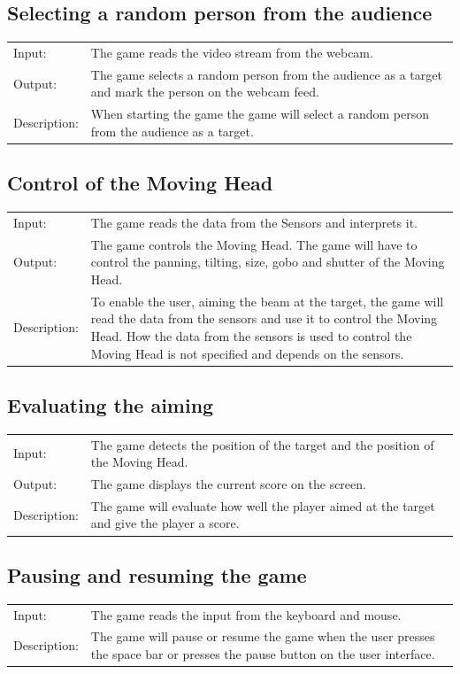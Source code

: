 \documentclass[a4paper]{scrreprt}
\begin{document}
\subsection{Selecting a random person from the audience}
\begin{longtable}{ l p{12cm}}
	Input: & The game reads the video stream from the webcam.\\
	Output: & The game selects a random person from the audience as a target and mark the person on the webcam feed.\\
	Description: & When starting the game the game will select a random person from the audience as a target.\\
\end{longtable}

\subsection{Control of the Moving Head}
\begin{longtable}{ l p{12cm}}
	Input: & The game reads the data from the Sensors and interprets it.\\
	Output: & The game controls the Moving Head. The game will have to control the panning, tilting, size, gobo and shutter of the Moving Head.\\
	Description: & To enable the user, aiming the beam at the target, the game will read the data from the sensors and use it to control the Moving Head. How the data from the sensors is used to control the Moving Head is not specified and depends on the sensors.\\
\end{longtable}

\subsection{Evaluating the aiming}
\begin{longtable}{ l p{12cm}}
	Input: & The game detects the position of the target and the position of the Moving Head.\\
	Output: & The game displays the current score on the screen.\\
	Description: & The game will evaluate how well the player aimed at the target and give the player a score.\\
\end{longtable}

\subsection{Pausing and resuming the game}
\begin{longtable}{ l p{12cm}}
	Input: & The game reads the input from the keyboard and mouse.\\
	Description: & The game will pause or resume the game when the user presses the space bar or presses the pause button on the user interface.\\
\end{longtable}
\end{document}
